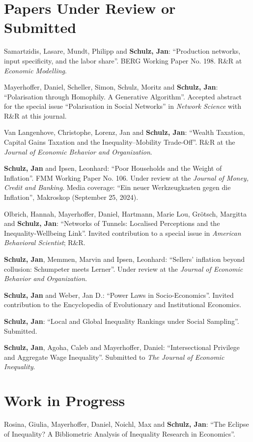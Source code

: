 \documentclass[margin]{res}
\begin{document}
\begin{resume}
	
	\section{Papers Under Review or Submitted} 
	Samartzidis, Lasare, Mundt, Philipp and \textbf{Schulz, Jan}: ``Production networks, input specificity, and the labor share''. BERG Working Paper No. 198. R\&R at \textit{Economic Modelling}.	
	
	
	Mayerhoffer, Daniel, Scheller, Simon, Schulz, Moritz and \textbf{Schulz, Jan}: ``Polarisation through Homophily. A Generative Algorithm''. Accepted abstract for the special issue ``Polarisation in Social Networks'' in \textit{Network Science} with R\&R at this journal.
	
	Van Langenhove, Christophe, Lorenz, Jan and \textbf{Schulz, Jan}: ``Wealth Taxation, Capital Gains Taxation and the Inequality--Mobility Trade-Off''. R\&R at the \textit{Journal of Economic Behavior and Organization}.
	
	\textbf{Schulz, Jan} and Ipsen, Leonhard: ``Poor Households and the Weight of Inflation''. FMM Working Paper No. 106. Under review at the \textit{Journal of Money, Credit and Banking}.
	Media coverage: ``Ein neuer Werkzeugkasten gegen die Inflation'', Makroskop (September 25, 2024).
	
	
	Olbrich, Hannah, Mayerhoffer, Daniel, Hartmann, Marie Lou, Gr\"otsch, Margitta and \textbf{Schulz, Jan}: ``Networks of Tunnels: Localised Perceptions and the Inequality-Wellbeing Link''. Invited contribution to a special issue in \textit{American Behavioral Scientist}; R\&R.
	
	\textbf{Schulz, Jan}, Memmen, Marvin and Ipsen, Leonhard: ``Sellers' inflation beyond collusion: Schumpeter meets Lerner''. Under review at the \textit{Journal of Economic Behavior and Organization}.
	
	\textbf{Schulz, Jan} and Weber, Jan D.: ``Power Laws in Socio-Economics''. Invited contribution to the Encyclopedia of Evolutionary and Institutional Economics.
	
	\textbf{Schulz, Jan}: ``Local and Global Inequality Rankings under Social Sampling''. Submitted.
	
	\textbf{Schulz, Jan}, Agoha, Caleb and Mayerhoffer, Daniel: ``Intersectional Privilege and Aggregate Wage Inequality''.  Submitted to \textit{The Journal of Economic Inequality}.
	\section{Work in Progress} 
	Rosina, Giulia, Mayerhoffer, Daniel, Noichl, Max and \textbf{Schulz, Jan}: ``The Eclipse of Inequality? A Bibliometric Analysis of Inequality Research in Economics''.
	

\end{resume}
\end{document}
